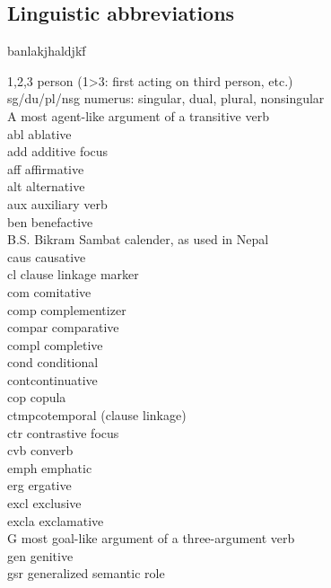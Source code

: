 \label{abbreviations}
\begin{refsection}

\section*{Linguistic abbreviations}

 {\small
\begin{tabbing}
banlakjhaldjkf\= \kill

1,2,3 		\> person (1>3: first acting on third person, etc.)\\
{\sc sg/du/pl/nsg} 		\> numerus: singular, dual, plural, nonsingular\\
A		\> most agent-like argument of a transitive verb\\
{\sc abl} \> ablative\\
{\sc add}\> additive focus\\
{\sc aff} \> affirmative\\
{\sc alt} \> alternative\\
{\sc aux}\> auxiliary verb\\
{\sc ben}		\> benefactive \\
{\sc B.S.}		\> Bikram Sambat calender, as used in Nepal\\
{\sc caus} \> causative\\
{\sc cl}\> clause linkage marker\\
{\sc com} \> comitative\\
{\sc comp} \> complementizer\\
{\sc compar} \> comparative\\
{\sc compl}\> completive\\
{\sc cond} \> conditional\\
{\sc cont}\>continuative\\
{\sc cop} \> copula\\
{\sc ctmp}\>cotemporal (clause linkage)\\
{\sc ctr} \> contrastive focus\\
{\sc cvb} \> converb\\
{\sc emph} \> emphatic\\
{\sc erg} \> ergative \\
{\sc excl} \> exclusive\\
{\sc excla}\> exclamative\\
G \> most goal-like argument of a three-argument verb\\
{\sc gen} \> genitive\\
{\sc gsr} \> generalized semantic role\\

\end{tabbing}}
\end{refsection}

